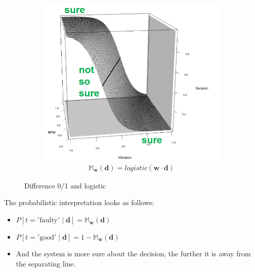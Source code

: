 \begin{figure}[H]
\begin{subfigure}{0.4\textwidth}
    \includegraphics[width=1\textwidth]{assets/regression/lr__logistic.png}
    \begin{align*}
      \mathbb{M}_\mathbf{w}(\mathbf{d}) = logistic(\mathbf{w}\cdot\mathbf{d})
    \end{align*}
  \end{subfigure}
  \caption{Difference 0/1 and logistic}
  \label{fig:4_difference_01_logistic}
\end{figure}

The probabilistic interpretation looks as follows:
\begin{itemize}
  \item $P[t='\text{faulty}' \mid \mathbf{d}] = \mathbb{M}_\mathbf{w}(\mathbf{d})$
  \item $P[t='\text{good}' \mid \mathbf{d}] = 1 - \mathbb{M}_\mathbf{w}(\mathbf{d})$
  \item And the system is more sure about the decision, the further it is away from the separating line.
\end{itemize}
